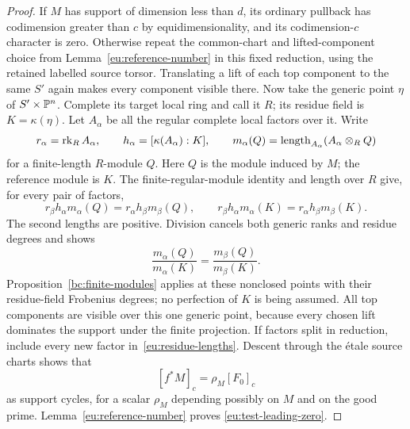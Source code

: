 \begin{proof}
If $M$ has support of dimension less than $d$, its ordinary pullback
has codimension greater than $c$ by equidimensionality, and its
codimension-$c$ character is zero.  Otherwise repeat the common-chart
and lifted-component choice from Lemma~\ref{eu:reference-number} in
this fixed reduction, using the retained labelled source torsor.
Translating a lift of each top component to the same $S'$ again makes
every component visible there.  Now take the generic point $\eta$ of
$S'\times\mathbb P^n$.  Complete its target local ring and call it $R$;
its residue field is $K=\kappa(\eta)$.  Let $A_\alpha$ be all the
regular complete local factors over it.  Write
\[
 r_\alpha=\operatorname{rk}_RA_\alpha,\qquad
 h_\alpha=[\kappa(A_\alpha):K],\qquad
 m_\alpha(Q)=\operatorname{length}_{A_\alpha}
                         (A_\alpha\otimes_RQ)
\]
for a finite-length $R$-module $Q$.  Here $Q$ is the module induced by
$M$; the reference module is $K$.  The finite-regular-module identity
and length over $R$ give, for every pair of factors,
\begin{equation}\label{eu:residue-lengths}
 r_\beta h_\alpha m_\alpha(Q)
       =r_\alpha h_\beta m_\beta(Q),\qquad
 r_\beta h_\alpha m_\alpha(K)
       =r_\alpha h_\beta m_\beta(K).
\end{equation}
The second lengths are positive.  Division cancels both generic ranks
and residue degrees and shows
\[
 \frac{m_\alpha(Q)}{m_\alpha(K)}
                  =\frac{m_\beta(Q)}{m_\beta(K)}.
\]
Proposition~\ref{bc:finite-modules} applies at these nonclosed points
with their residue-field Frobenius degrees; no perfection of $K$ is
being assumed.  All top components are visible over this one generic
point, because every chosen lift dominates the support under the
finite projection.  If factors split in reduction, include every new
factor in~\eqref{eu:residue-lengths}.  Descent through the \'etale
source charts shows that
\[
                   [f^*M]_c=\rho_M[F_0]_c
\]
as support cycles, for a scalar $\rho_M$ depending possibly on $M$ and
on the good prime.  Lemma~\ref{eu:reference-number} proves
\eqref{eu:test-leading-zero}.


\end{proof}
